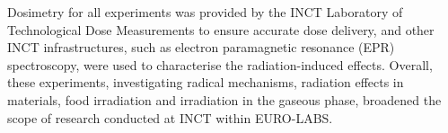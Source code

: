 %
%
%
%
%

Dosimetry for all experiments was provided by the INCT Laboratory of Technological Dose Measurements to ensure accurate dose delivery, and other INCT infrastructures, such as electron paramagnetic resonance (EPR) spectroscopy, were used to characterise the radiation-induced effects. Overall, these experiments, investigating radical mechanisms, radiation effects in materials, food irradiation and irradiation in the gaseous phase, broadened the scope of research conducted at INCT within EURO-LABS.


